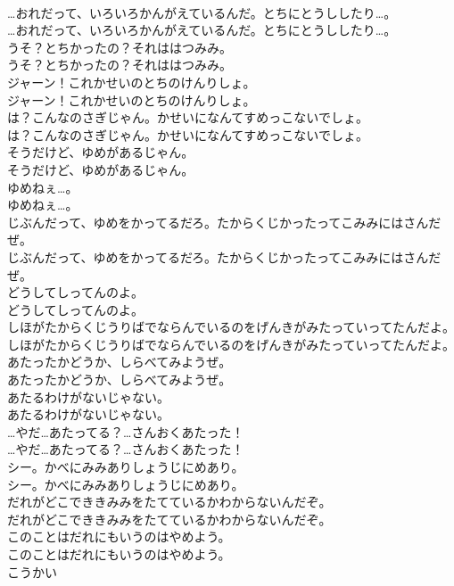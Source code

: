 \documentclass[8pt]{extreport}
\begin{document}
\begin{CJK}{UTF8}{min}
\\	…おれだって、いろいろかんがえているんだ。とちにとうししたり…。
\\	…おれだって、いろいろかんがえているんだ。とちにとうししたり…。
\\	うそ？とちかったの？それははつみみ。
\\	うそ？とちかったの？それははつみみ。
\\	ジャーン！これかせいのとちのけんりしょ。
\\	ジャーン！これかせいのとちのけんりしょ。
\\	は？こんなのさぎじゃん。かせいになんてすめっこないでしょ。
\\	は？こんなのさぎじゃん。かせいになんてすめっこないでしょ。
\\	そうだけど、ゆめがあるじゃん。
\\	そうだけど、ゆめがあるじゃん。
\\	ゆめねぇ…。
\\	ゆめねぇ…。
\\	じぶんだって、ゆめをかってるだろ。たからくじかったってこみみにはさんだぜ。
\\	じぶんだって、ゆめをかってるだろ。たからくじかったってこみみにはさんだぜ。
\\	どうしてしってんのよ。
\\	どうしてしってんのよ。
\\	しほがたからくじうりばでならんでいるのをげんきがみたっていってたんだよ。
\\	しほがたからくじうりばでならんでいるのをげんきがみたっていってたんだよ。
\\	あたったかどうか、しらべてみようぜ。
\\	あたったかどうか、しらべてみようぜ。
\\	あたるわけがないじゃない。
\\	あたるわけがないじゃない。
\\	…やだ…あたってる？…さんおくあたった！
\\	…やだ…あたってる？…さんおくあたった！
\\	シー。かべにみみありしょうじにめあり。
\\	シー。かべにみみありしょうじにめあり。
\\	だれがどこでききみみをたてているかわからないんだぞ。
\\	だれがどこでききみみをたてているかわからないんだぞ。
\\	このことはだれにもいうのはやめよう。
\\	このことはだれにもいうのはやめよう。
\\	こうかい

\end{CJK}
\end{document}
